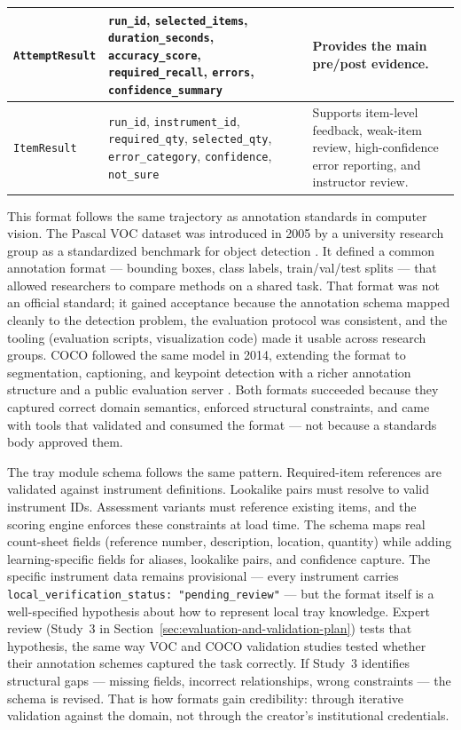 \documentclass[10pt,a4paper]{article}
\begin{document}
\begin{table}[H]
\begin{tabularx}{\textwidth}{|>{\raggedright\arraybackslash}X|>{\raggedright\arraybackslash}X|>{\raggedright\arraybackslash}X|}
\hline
\texttt{AttemptResult} & \texttt{run\_id}, \texttt{selected\_items}, \texttt{duration\_seconds}, \texttt{accuracy\_score}, \texttt{required\_recall}, \texttt{errors}, \texttt{confidence\_summary} & Provides the main pre/post evidence. \\
\hline
\texttt{ItemResult} & \texttt{run\_id}, \texttt{instrument\_id}, \texttt{required\_qty}, \texttt{selected\_qty}, \texttt{error\_category}, \texttt{confidence}, \texttt{not\_sure} & Supports item-level feedback, weak-item review, high-confidence error reporting, and instructor review. \\
\hline
\end{tabularx}
\end{table}
This format follows the same trajectory as annotation standards in computer
vision. The Pascal VOC dataset was introduced in 2005 by a university research
group as a standardized benchmark for object detection
\cite{everingham-et-al-2010-voc}. It defined a common annotation
format --- bounding boxes, class labels, train/val/test splits --- that allowed
researchers to compare methods on a shared task. That format was not an official
standard; it gained acceptance because the annotation schema mapped cleanly to
the detection problem, the evaluation protocol was consistent, and the tooling
(evaluation scripts, visualization code) made it usable across research groups.
COCO followed the same model in 2014, extending the format to segmentation,
captioning, and keypoint detection with a richer annotation structure and a
public evaluation server \cite{lin-et-al-2014-coco}. Both
formats succeeded because they captured correct domain semantics, enforced
structural constraints, and came with tools that validated and consumed the
format --- not because a standards body approved them.

The tray module schema follows the same pattern. Required-item references are
validated against instrument definitions. Lookalike pairs must resolve to valid
instrument IDs. Assessment variants must reference existing items, and the
scoring engine enforces these constraints at load time. The schema maps real
count-sheet fields (reference number, description, location, quantity) while
adding learning-specific fields for aliases, lookalike pairs, and confidence
capture. The specific instrument data remains provisional --- every instrument
carries \texttt{local\_verification\_status: "pending\_review"} --- but the
format itself is a well-specified hypothesis about how to represent local tray
knowledge. Expert review (Study~3 in
Section~\ref{sec:evaluation-and-validation-plan}) tests that hypothesis, the
same way VOC and COCO validation studies tested whether their annotation schemes
captured the task correctly. If Study~3 identifies structural gaps --- missing
fields, incorrect relationships, wrong constraints --- the schema is revised.
That is how formats gain credibility: through iterative validation against the
domain, not through the creator's institutional credentials.
\end{document}
